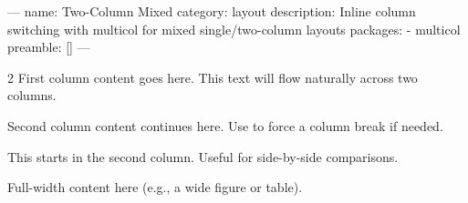 ---
name: Two-Column Mixed
category: layout
description: Inline column switching with multicol for mixed single/two-column layouts
packages:
  - multicol
preamble: []
---
\begin{multicols}{2}
  First column content goes here. This text will flow naturally across two columns.

  Second column content continues here. Use \columnbreak to force a column break if needed.

  \columnbreak

  This starts in the second column. Useful for side-by-side comparisons.
\end{multicols}

Full-width content here (e.g., a wide figure or table).
